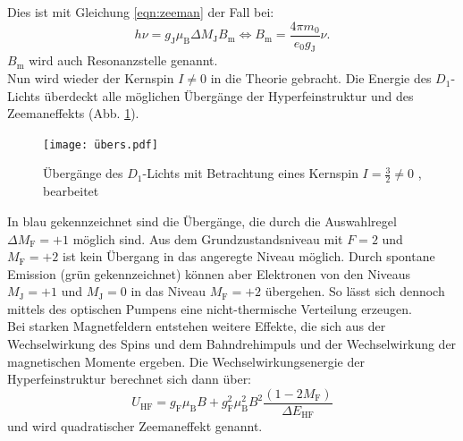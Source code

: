 Dies ist mit Gleichung \eqref{eqn:zeeman} der Fall bei:
\begin{equation}
  h \nu = g_{\text{J}} \mu_{\text{B}} \Delta M_{\text{J}} B_{\text{m}} \Leftrightarrow B_{\text{m}} = \frac{4 \pi m_{0}}{e_{0} g_{\text{J}}} \nu.
\label{eqn:resonanz}
\end{equation}
$B_{\text{m}}$ wird auch Resonanzstelle genannt.
%
%
\\Nun wird wieder der Kernspin $I≠0$ in die Theorie gebracht.
Die Energie des $D_{1}$-Lichts überdeckt alle möglichen Übergänge der Hyperfeinstruktur und des Zeemaneffekts (Abb. \ref{fig:übergänge}).
\begin{figure}[h!]
  \centering
  \texttt{[image: übers.pdf]}
  \caption{Übergänge des $D_{1}$-Lichts mit Betrachtung eines Kernspin $I=\frac{3}{2}≠0$ \cite{1}, bearbeitet}
  \label{fig:übergänge}
\end{figure}
In blau gekennzeichnet sind die Übergänge, die durch die Auswahlregel $\Delta M_{\text{F}}=+1$ möglich sind.
Aus dem Grundzustandsniveau mit $F=2$ und $M_{\text{F}}=+2$ ist kein Übergang in das angeregte Niveau möglich.
Durch spontane Emission (grün gekennzeichnet) können aber Elektronen von den Niveaus $M_{\text{J}}=+1$ und $M_{\text{J}}=0$ in das Niveau $M_{\text{F}}=+2$ übergehen.
So lässt sich dennoch mittels des optischen Pumpens eine nicht-thermische Verteilung erzeugen.
%
%
\\Bei starken Magnetfeldern entstehen weitere Effekte, die sich aus der Wechselwirkung des Spins und dem Bahndrehimpuls und der Wechselwirkung der magnetischen Momente ergeben.
Die Wechselwirkungsenergie der Hyperfeinstruktur berechnet sich dann über:
\begin{equation}
U_{\text{HF}}= g_{\text{F}} \mu_{\text{B}} B + g_{\text{F}}^2 \mu_{\text{B}}^2 B^2 \frac{(1- 2M_{\text{F}})}{\Delta E_{\text{HF}}}
\label{eqn:quadzeeman}
\end{equation}
und wird quadratischer Zeemaneffekt genannt.
